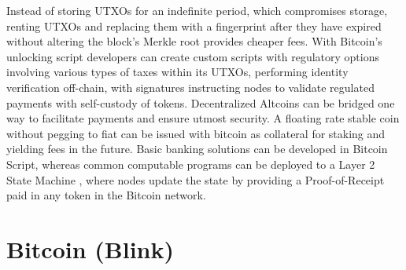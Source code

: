 \documentclass[a4paper,	10pt]{extarticle}
\begin{document}
Instead of storing UTXOs for an indefinite period, which compromises storage, renting UTXOs and replacing them with a fingerprint after they have expired without altering the block’s Merkle root provides cheaper fees. With Bitcoin’s unlocking script developers can create custom scripts with regulatory options involving various types of taxes within its UTXOs, performing identity verification off-chain, with signatures instructing nodes to validate regulated payments with self-custody of tokens. Decentralized Altcoins can be bridged one way to facilitate payments and ensure utmost security. A floating rate stable coin \cite{stablecoin} without pegging to fiat can be issued with bitcoin as collateral for staking and yielding fees in the future. Basic banking solutions can be developed in Bitcoin Script, whereas common computable programs can be deployed to a Layer 2 State Machine \cite{wood2014ethereum}, where nodes update the state by providing a Proof-of-Receipt paid in any token in the Bitcoin network.

\section{Bitcoin (Blink)} 
\end{document}
